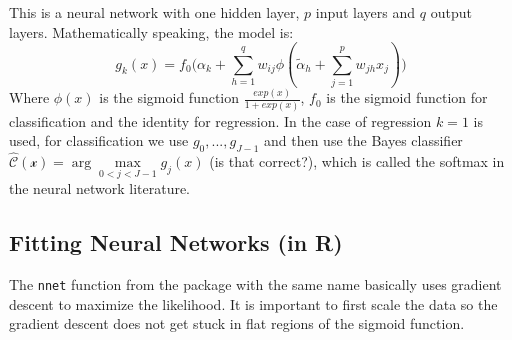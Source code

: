 \documentclass[]{book}
\newenvironment{Shaded}{\begin{snugshade}}{\end{snugshade}}
\newcommand{\KeywordTok}[1]{\textcolor[rgb]{0.13,0.29,0.53}{\textbf{{#1}}}}
\newcommand{\DataTypeTok}[1]{\textcolor[rgb]{0.13,0.29,0.53}{{#1}}}
\newcommand{\DecValTok}[1]{\textcolor[rgb]{0.00,0.00,0.81}{{#1}}}
\newcommand{\FloatTok}[1]{\textcolor[rgb]{0.00,0.00,0.81}{{#1}}}
\newcommand{\StringTok}[1]{\textcolor[rgb]{0.31,0.60,0.02}{{#1}}}
\newcommand{\CommentTok}[1]{\textcolor[rgb]{0.56,0.35,0.01}{\textit{{#1}}}}
\newcommand{\OtherTok}[1]{\textcolor[rgb]{0.56,0.35,0.01}{{#1}}}
\newcommand{\NormalTok}[1]{{#1}}
\begin{document}
This is a neural network with one hidden layer, \(p\) input layers and
\(q\) output layers. Mathematically speaking, the model is:
\[ g_k(x) = f_0\Big(\alpha_k +
\sum\limits_{h = 1}^q w_{ij} \phi(\tilde{\alpha}_h + \sum\limits_{j = 1}^p
w_{jh}x_j)\Big)\] Where \(\phi(x)\) is the sigmoid function
\(\frac{exp(x)}{1 + exp(x)}\), \(f_0\) is the sigmoid function for
classification and the identity for regression. In the case of
regression \(k = 1\) is used, for classification we use
\(g_0, ..., g_{J-1}\) and then use the Bayes classifier
\(\mathcal{\hat{C}(x)} = \arg\max\limits_{0<j<J-1} g_j(x)\) (is that
correct?), which is called the softmax in the neural network literature.

\subsection{Fitting Neural Networks (in
R)}\label{fitting-neural-networks-in-r}

The \texttt{nnet} function from the package with the same name basically
uses gradient descent to maximize the likelihood. It is important to
first scale the data so the gradient descent does not get stuck in flat
regions of the sigmoid function.

\begin{Shaded}
\end{Shaded}
\end{document}
